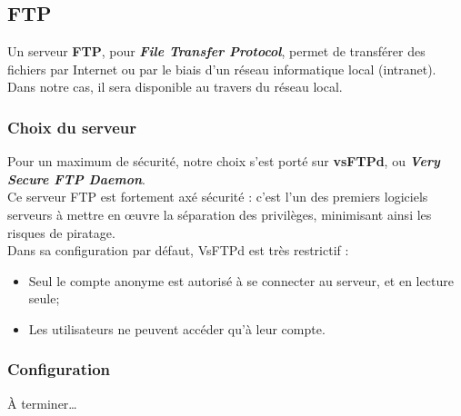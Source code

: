 \subsection{FTP}
\label{subsec:ftp}

Un serveur \textbf{FTP}, pour \textit{\textbf{File Transfer Protocol}}, permet
de transférer des fichiers par Internet ou par le biais d'un réseau informatique
local (intranet). \\
Dans notre cas, il sera disponible au travers du réseau local.


\subsubsection{Choix du serveur}
\label{subsubsec:choix-serveur}

Pour un maximum de sécurité, notre choix s'est porté sur \textbf{vsFTPd}, ou
\textit{\textbf{Very Secure FTP Daemon}}.  \\
Ce serveur FTP est fortement axé sécurité : c'est l'un des premiers logiciels
serveurs à mettre en œuvre la séparation des privilèges, minimisant ainsi les
risques de piratage. \\

Dans sa configuration par défaut, VsFTPd est très restrictif :
\begin{itemize}

    \item Seul le compte anonyme est autorisé à se connecter au serveur, et en
    lecture seule;
    \item Les utilisateurs ne peuvent accéder qu'à leur compte.

\end{itemize}


\subsubsection{Configuration}
\label{subsubsec:config}

À terminer…



